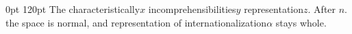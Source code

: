 \documentclass[12pt]{article}
\begin{document}
 0pt 120pt The characteristically$x$ incomprehensibilities$y$
representation$z$. After $n$. the space is normal, and representation of
internationalization$\alpha$ stays whole.
\end{document}
